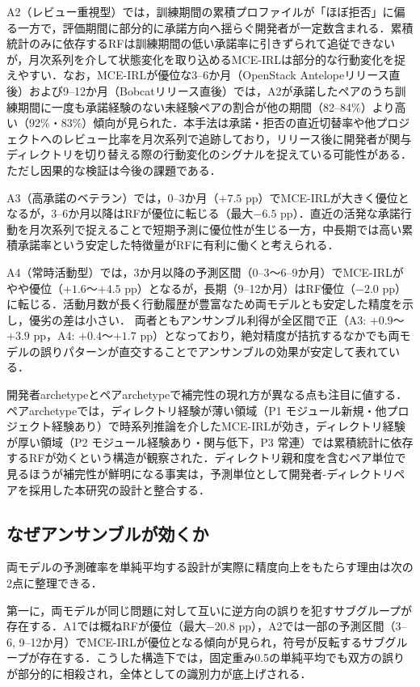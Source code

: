 \documentclass[submit,noauthor,ses,dvipdfmx]{ipsj}
\begin{document}
A2（レビュー重視型）では，訓練期間の累積プロファイルが「ほぼ拒否」に偏る一方で，評価期間に部分的に承諾方向へ揺らぐ開発者が一定数含まれる．累積統計のみに依存するRFは訓練期間の低い承諾率に引きずられて追従できないが，月次系列を介して状態変化を取り込めるMCE-IRLは部分的な行動変化を捉えやすい．なお，MCE-IRLが優位な3--6か月（OpenStack Antelopeリリース直後）および9--12か月（Bobcatリリース直後）では，A2が承諾したペアのうち訓練期間に一度も承諾経験のない未経験ペアの割合が他の期間（82--84\%）より高い（92\%・83\%）傾向が見られた．本手法は承諾・拒否の直近切替率や他プロジェクトへのレビュー比率を月次系列で追跡しており，リリース後に開発者が関与ディレクトリを切り替える際の行動変化のシグナルを捉えている可能性がある．ただし因果的な検証は今後の課題である．

A3（高承諾のベテラン）では，0--3か月（$+7.5$ pp）でMCE-IRLが大きく優位となるが，3--6か月以降はRFが優位に転じる（最大$-6.5$ pp）．直近の活発な承諾行動を月次系列で捉えることで短期予測に優位性が生じる一方，中長期では高い累積承諾率という安定した特徴量がRFに有利に働くと考えられる．

A4（常時活動型）では，3か月以降の予測区間（0--3〜6--9か月）でMCE-IRLがやや優位（$+1.6$〜$+4.5$ pp）となるが，長期（9--12か月）はRF優位（$-2.0$ pp）に転じる．活動月数が長く行動履歴が豊富なため両モデルとも安定した精度を示し，優劣の差は小さい．
両者ともアンサンブル利得が全区間で正（A3: $+0.9$〜$+3.9$ pp，A4: $+0.4$〜$+1.7$ pp）となっており，絶対精度が拮抗するなかでも両モデルの誤りパターンが直交することでアンサンブルの効果が安定して表れている．

開発者archetypeとペアarchetypeで補完性の現れ方が異なる点も注目に値する．ペアarchetypeでは，ディレクトリ経験が薄い領域（P1 モジュール新規・他プロジェクト経験あり）で時系列推論を介したMCE-IRLが効き，ディレクトリ経験が厚い領域（P2 モジュール経験あり・関与低下，P3 常連）では累積統計に依存するRFが効くという構造が観察された．ディレクトリ親和度を含むペア単位で見るほうが補完性が鮮明になる事実は，予測単位として開発者-ディレクトリペアを採用した本研究の設計と整合する．

\subsection{なぜアンサンブルが効くか}
両モデルの予測確率を単純平均する設計が実際に精度向上をもたらす理由は次の2点に整理できる．

第一に，両モデルが同じ問題に対して互いに逆方向の誤りを犯すサブグループが存在する．A1では概ねRFが優位（最大$-20.8$ pp），A2では一部の予測区間（3--6, 9--12か月）でMCE-IRLが優位となる傾向が見られ，符号が反転するサブグループが存在する．こうした構造下では，固定重み0.5の単純平均でも双方の誤りが部分的に相殺され，全体としての識別力が底上げされる．
\end{document}
